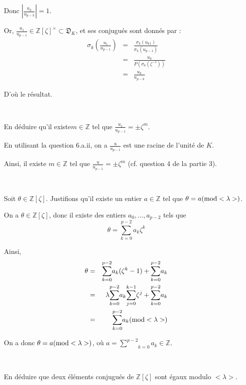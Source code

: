 Donc $\left| \frac{u_k}{u_{p - k}} \right| = 1$.

Or, $\frac{u_1}{u_{p - 1}} \in \mathbb{Z} [\zeta]^{\times} \subset
\mathfrak{D}_K$, et ses conjugu{\'e}s sont donn{\'e}s par :
\begin{eqnarray*}
  \sigma_k \left( \frac{u_1}{u_{p - 1}} \right) & = & \frac{\sigma_k (u_{k
  1})}{\sigma_k (u_{p - 1})}\\
  & = & \frac{u_k}{P (\sigma_k (\zeta^{- 1}))}\\
  & = & \frac{u_k}{u_{p - k}}
\end{eqnarray*}


D'o{\`u} le r{\'e}sultat.

\

 En d{\'e}duire qu'il existe$m \in \mathbb{Z}$ tel que
$\frac{u_1}{u_{p - 1}} = \pm \zeta^m$.

En utilisant la question 6.a.ii, on a $\frac{u}{u_{p - 1}}$ est une racine de
l'unit{\'e} de $K$.

Ainsi, il existe $m \in \mathbb{Z}$ tel que $\frac{u}{u_{p - 1}} = \pm
\zeta^m$ (cf. question 4 de la partie 3).

\

 Soit $\theta \in \mathbb{Z}[\zeta]$. Justifions qu'il
existe un entier $a \in \mathbb{Z}$ tel que $\theta = a (\operatorname{mod} < \lambda
>)$.

On a $\theta \in \mathbb{Z} [\zeta]$, donc il existe des entiers $a_0,
\ldots, a_{p - 2}$ tels que
\[ \theta = \underset{k = 0}{\overset{p - 2}{\sum}} a_k \zeta^k \]


Ainsi,
\begin{eqnarray*}
  \theta & = & \underset{k = 0}{\overset{p - 2}{\sum}} a_k (\zeta^k - 1) +
  \underset{k = 0}{\overset{p - 2}{\sum}} a_k\\
  & = & \lambda \underset{k = 0}{\overset{p - 2}{\sum}} a_k \underset{j =
  0}{\overset{k - 1}{\sum}} \zeta^j + \underset{k = 0}{\overset{p - 2}{\sum}}
  a_k\\
  & = & \underset{k = 0}{\overset{p - 2}{\sum}} a_k  (\operatorname{mod} < \lambda >)
\end{eqnarray*}


On a donc $\theta = a (\operatorname{mod} < \lambda >)$, o{\`u} $a = \underset{k =
0}{\overset{p - 2}{\sum}} a_k \in \mathbb{Z}$.

\

En d{\'e}duire que deux {\'e}l{\'e}ments conjugu{\'e}s de $\mathbb{Z}[\zeta]$
sont {\'e}gaux modulo $< \lambda > .$

